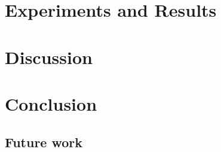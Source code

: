 \documentclass[UKenglish]{uiomasterthesis} %
\theoremstyle{definition}
\begin{document}
\chapter{Experiments and Results} \label{chapter:experiments}

\chapter{Discussion} \label{chapter:discussion}

\chapter{Conclusion} \label{chapter:conclusion}

\section{Future work}



\backmatter{}
\printbibliography{}
\end{document}
